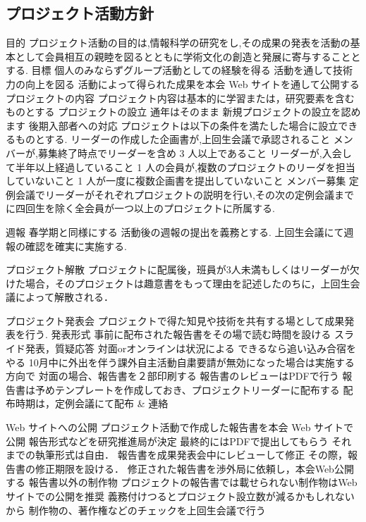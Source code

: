 \subsection*{プロジェクト活動方針}


目的
    プロジェクト活動の目的は,情報科学の研究をし,その成果の発表を活動の基本として会員相互の親睦を図るとともに学術文化の創造と発展に寄与することとする.
目標
    個人のみならずグループ活動としての経験を得る
    活動を通して技術力の向上を図る
    活動によって得られた成果を本会 Web サイトを通して公開する
プロジェクトの内容
    プロジェクト内容は基本的に学習または，研究要素を含むものとする
プロジェクトの設立
    通年はそのまま
    新規プロジェクトの設立を認めます
    後期入部者への対応
    プロジェクトは以下の条件を満たした場合に設立できるものとする.
    リーダーの作成した企画書が,上回生会議で承認されること
    メンバーが,募集終了時点でリーダーを含め 3 人以上であること
    リーダーが,入会して半年以上経過していること
    1 人の会員が,複数のプロジェクトのリーダを担当していないこと
    1 人が一度に複数企画書を提出していないこと
メンバー募集
    定例会議でリーダーがそれぞれプロジェクトの説明を行い,その次の定例会議までに四回生を除く全会員が一つ以上のプロジェクトに所属する.

週報
    春学期と同様にする
    活動後の週報の提出を義務とする.
    上回生会議にて週報の確認を確実に実施する.
    
    
プロジェクト解散
    プロジェクトに配属後，班員が3人未満もしくはリーダーが欠けた場合，そのプロジェクトは趣意書をもって理由を記述したのちに，上回生会議によって解散される．
    
プロジェクト発表会
    プロジェクトで得た知見や技術を共有する場として成果発表を行う.
    発表形式
    事前に配布された報告書をその場で読む時間を設ける
    スライド発表，質疑応答
    対面orオンラインは状況による
    できるなら追い込み合宿をやる
    10月中に外出を伴う課外自主活動自粛要請が無効になった場合は実施する方向で
    対面の場合、報告書を２部印刷する
    報告書のレビューはPDFで行う
    報告書は予めテンプレートを作成しておき、プロジェクトリーダーに配布する
    配布時期は，定例会議にて配布 & 連絡
        
Web サイトへの公開
    プロジェクト活動で作成した報告書を本会 Web サイトで公開
    報告形式などを研究推進局が決定
    最終的にはPDFで提出してもらう
    それまでの執筆形式は自由．
    報告書を成果発表会中にレビューして修正
    その際，報告書の修正期限を設ける．
    修正された報告書を渉外局に依頼し，本会Web公開する
    報告書以外の制作物
    プロジェクトの報告書では載せられない制作物はWebサイトでの公開を推奨
    義務付けつるとプロジェクト設立数が減るかもしれないから
    制作物の、著作権などのチェックを上回生会議で行う
        
